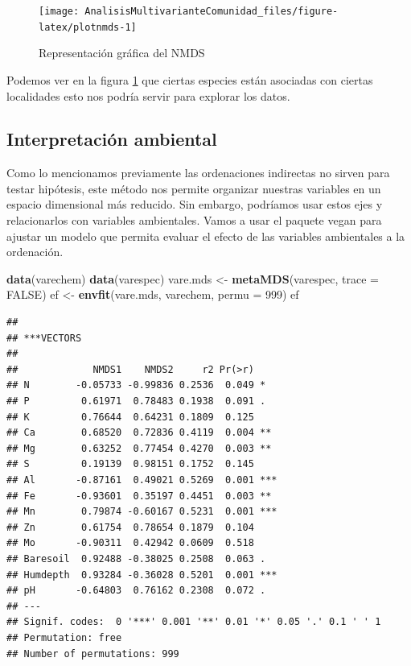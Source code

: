 \documentclass[]{book}
\newenvironment{Shaded}{\begin{snugshade}}{\end{snugshade}}
\newcommand{\KeywordTok}[1]{\textcolor[rgb]{0.13,0.29,0.53}{\textbf{{#1}}}}
\newcommand{\DataTypeTok}[1]{\textcolor[rgb]{0.13,0.29,0.53}{{#1}}}
\newcommand{\DecValTok}[1]{\textcolor[rgb]{0.00,0.00,0.81}{{#1}}}
\newcommand{\StringTok}[1]{\textcolor[rgb]{0.31,0.60,0.02}{{#1}}}
\newcommand{\OtherTok}[1]{\textcolor[rgb]{0.56,0.35,0.01}{{#1}}}
\newcommand{\NormalTok}[1]{{#1}}
\begin{document}
\begin{figure}

{\centering \texttt{[image: AnalisisMultivarianteComunidad\_files/figure-latex/plotnmds-1]} 

}

\caption{Representación gráfica del NMDS}\label{fig:plotnmds}
\end{figure}

Podemos ver en la figura \ref{fig:plotnmds} que ciertas especies están
asociadas con ciertas localidades esto nos podría servir para explorar
los datos.

\subsection{Interpretación ambiental}\label{interpretacion-ambiental}

Como lo mencionamos previamente las ordenaciones indirectas no sirven
para testar hipótesis, este método nos permite organizar nuestras
variables en un espacio dimensional más reducido. Sin embargo, podríamos
usar estos ejes y relacionarlos con variables ambientales. Vamos a usar
el paquete vegan para ajustar un modelo que permita evaluar el efecto de
las variables ambientales a la ordenación.

\begin{Shaded}
\begin{Highlighting}[]
\KeywordTok{data}\NormalTok{(varechem)}
\KeywordTok{data}\NormalTok{(varespec)}
\NormalTok{vare.mds <-}\StringTok{ }\KeywordTok{metaMDS}\NormalTok{(varespec, }\DataTypeTok{trace =} \OtherTok{FALSE}\NormalTok{)}
\NormalTok{ef <-}\StringTok{ }\KeywordTok{envfit}\NormalTok{(vare.mds, varechem, }\DataTypeTok{permu =} \DecValTok{999}\NormalTok{)}
\NormalTok{ef}
\end{Highlighting}
\end{Shaded}

\begin{verbatim}
## 
## ***VECTORS
## 
##             NMDS1    NMDS2     r2 Pr(>r)    
## N        -0.05733 -0.99836 0.2536  0.049 *  
## P         0.61971  0.78483 0.1938  0.091 .  
## K         0.76644  0.64231 0.1809  0.125    
## Ca        0.68520  0.72836 0.4119  0.004 ** 
## Mg        0.63252  0.77454 0.4270  0.003 ** 
## S         0.19139  0.98151 0.1752  0.145    
## Al       -0.87161  0.49021 0.5269  0.001 ***
## Fe       -0.93601  0.35197 0.4451  0.003 ** 
## Mn        0.79874 -0.60167 0.5231  0.001 ***
## Zn        0.61754  0.78654 0.1879  0.104    
## Mo       -0.90311  0.42942 0.0609  0.518    
## Baresoil  0.92488 -0.38025 0.2508  0.063 .  
## Humdepth  0.93284 -0.36028 0.5201  0.001 ***
## pH       -0.64803  0.76162 0.2308  0.072 .  
## ---
## Signif. codes:  0 '***' 0.001 '**' 0.01 '*' 0.05 '.' 0.1 ' ' 1
## Permutation: free
## Number of permutations: 999
\end{verbatim}
\end{document}
